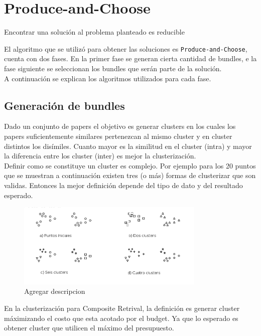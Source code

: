 \section{Produce-and-Choose}
Encontrar una solución al problema planteado es reducible 

El algoritmo que se utilizó para obtener las soluciones es \texttt{Produce-and-Choose}, cuenta con 
dos fases. En la primer fase se generan cierta cantidad de bundles, e la fase siguiente se seleccionan los bundles que serán parte de la solución.\\
A continuación se explican los algoritmos utilizados para cada fase.
\subsection{Generación de bundles}
Dado un conjunto de papers el objetivo es generar clusters en los cuales los papers suficientemente similares pertenezcan al mismo cluster y en cluster distintos los disímiles. Cuanto mayor es la similitud en el cluster (intra) y mayor la diferencia entre los cluster (inter) es mejor la clusterización.\\
Definir como se constituye un cluster es complejo. Por ejemplo para los 20 puntos que se muestran a continuación existen tres (o más) formas de clusterizar que son validas. Entonces la mejor definición depende del tipo de dato y del resultado esperado.

\begin{figure}[H]
  \centering
    \includegraphics[width=0.8\textwidth]{img/howToCluster.png}
  \caption{Agregar descripcion}
  \label{res:img-howToCluster}
\end{figure}

En la clusterización para Composite Retrival, la definición es generar cluster máximizando el costo que esta acotado por el budget.
Ya que lo esperado es obtener cluster que utilicen el máximo del presupuesto.\\

